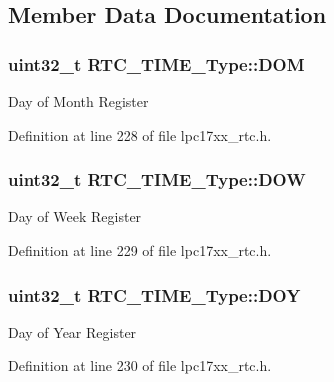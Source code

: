 \subsection{\-Member \-Data \-Documentation}
\hypertarget{struct_r_t_c___t_i_m_e___type_a3e4c78e76b051e7ddd130b69c8147023}{
\subsubsection[{\-D\-O\-M}]{\setlength{\rightskip}{0pt plus 5cm}uint32\-\_\-t {\bf \-R\-T\-C\-\_\-\-T\-I\-M\-E\-\_\-\-Type\-::\-D\-O\-M}}}\label{struct_r_t_c___t_i_m_e___type_a3e4c78e76b051e7ddd130b69c8147023}
\-Day of \-Month \-Register 

\-Definition at line 228 of file lpc17xx\-\_\-rtc.\-h.

\hypertarget{struct_r_t_c___t_i_m_e___type_ad74fb3c460145484ccc91db5bf7b29bc}{
\subsubsection[{\-D\-O\-W}]{\setlength{\rightskip}{0pt plus 5cm}uint32\-\_\-t {\bf \-R\-T\-C\-\_\-\-T\-I\-M\-E\-\_\-\-Type\-::\-D\-O\-W}}}\label{struct_r_t_c___t_i_m_e___type_ad74fb3c460145484ccc91db5bf7b29bc}
\-Day of \-Week \-Register 

\-Definition at line 229 of file lpc17xx\-\_\-rtc.\-h.

\hypertarget{struct_r_t_c___t_i_m_e___type_a73fd691a18c0bfc5d811e5fa59a575eb}{
\subsubsection[{\-D\-O\-Y}]{\setlength{\rightskip}{0pt plus 5cm}uint32\-\_\-t {\bf \-R\-T\-C\-\_\-\-T\-I\-M\-E\-\_\-\-Type\-::\-D\-O\-Y}}}\label{struct_r_t_c___t_i_m_e___type_a73fd691a18c0bfc5d811e5fa59a575eb}
\-Day of \-Year \-Register 

\-Definition at line 230 of file lpc17xx\-\_\-rtc.\-h.

